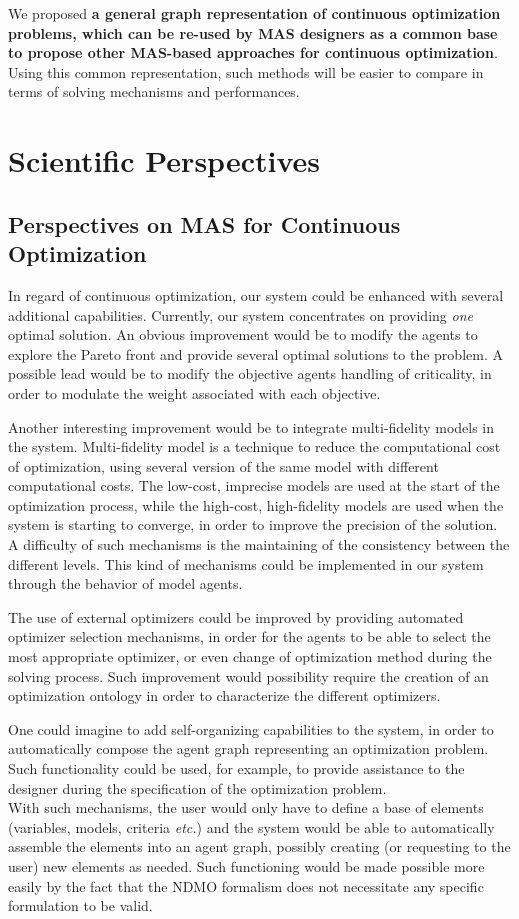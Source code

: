 We proposed \textbf{a general graph representation of continuous optimization problems, which can be re-used by MAS designers as a common base to propose other MAS-based approaches for continuous optimization}. Using this common representation, such methods will be easier to compare in terms of solving mechanisms and performances.

\section*{Scientific Perspectives}

\subsection*{Perspectives on MAS for Continuous Optimization}

In regard of continuous optimization, our system could be enhanced with several additional capabilities. Currently, our system concentrates on providing \emph{one} optimal solution. An obvious improvement would be to modify the agents to explore the Pareto front and provide several optimal solutions to the problem. A possible lead would be to modify the objective agents handling of criticality, in order to modulate the weight associated with each objective.

Another interesting improvement would be to integrate multi-fidelity models in the system. Multi-fidelity model is a technique to reduce the computational cost of optimization, using several version of the same model with different computational costs. The low-cost, imprecise models are used at the start of the optimization process, while the high-cost, high-fidelity models are used when the system is starting to converge, in order to improve the precision of the solution. A difficulty of such mechanisms is the maintaining of the consistency between the different levels. This kind of mechanisms could be implemented in our system through the behavior of model agents.

The use of external optimizers could be improved by providing automated optimizer selection mechanisms, in order for the agents to be able to select the most appropriate optimizer, or even change of optimization method during the solving process. Such improvement would possibility require the creation of an optimization ontology in order to characterize the different optimizers.

One could imagine to add self-organizing capabilities to the system, in order to automatically compose the agent graph representing an optimization problem. Such functionality could be used, for example, to provide assistance to the designer during the specification of the optimization problem.\\
With such mechanisms, the user would only have to define a base of elements (variables, models, criteria \emph{etc.}) and the system would be able to automatically assemble the elements into an agent graph, possibly creating (or requesting to the user) new elements as needed. Such functioning would be made possible more easily by the fact that the NDMO formalism does not necessitate any specific formulation to be valid.

